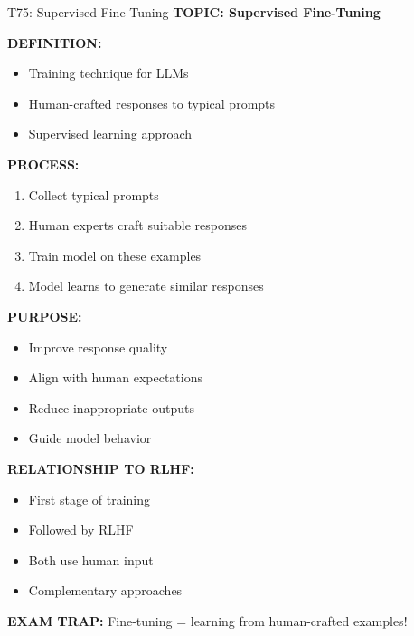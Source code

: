 \documentclass[8pt]{beamer}
\begin{document}
	\begin{frame}{T75: Supervised Fine-Tuning}
		\fontsize{6.5}{7.5}\selectfont
		\textbf{TOPIC: Supervised Fine-Tuning}
		
		\vspace{0.1cm}
		\textbf{DEFINITION:}
		\begin{itemize}
			\item Training technique for LLMs
			\item Human-crafted responses to typical prompts
			\item Supervised learning approach
		\end{itemize}
		
		\vspace{0.1cm}
		\textbf{PROCESS:}
		\begin{enumerate}
			\item Collect typical prompts
			\item Human experts craft suitable responses
			\item Train model on these examples
			\item Model learns to generate similar responses
		\end{enumerate}
		
		\vspace{0.1cm}
		\textbf{PURPOSE:}
		\begin{itemize}
			\item Improve response quality
			\item Align with human expectations
			\item Reduce inappropriate outputs
			\item Guide model behavior
		\end{itemize}
		
		\vspace{0.1cm}
		\textbf{RELATIONSHIP TO RLHF:}
		\begin{itemize}
			\item First stage of training
			\item Followed by RLHF
			\item Both use human input
			\item Complementary approaches
		\end{itemize}
		
		\textcolor{myred}{\textbf{EXAM TRAP:}} Fine-tuning = \textcolor{myblue}{learning from human-crafted examples}!
	\end{frame}
	
\end{document}
